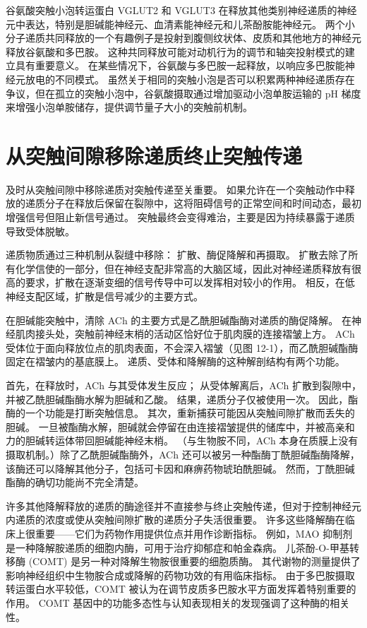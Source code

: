 谷氨酸突触小泡转运蛋白 VGLUT2 和 VGLUT3 在释放其他类别神经递质的神经元中表达，特别是胆碱能神经元、血清素能神经元和儿茶酚胺能神经元。
两个小分子递质共同释放的一个有趣例子是投射到腹侧纹状体、皮质和其他地方的神经元释放谷氨酸和多巴胺。 这种共同释放可能对动机行为的调节和轴突投射模式的建立具有重要意义。
在某些情况下，谷氨酸与多巴胺一起释放，以响应多巴胺能神经元放电的不同模式。
虽然关于相同的突触小泡是否可以积累两种神经递质存在争议，但在孤立的突触小泡中，谷氨酸摄取通过增加驱动小泡单胺运输的 pH 梯度来增强小泡单胺储存，提供调节量子大小的突触前机制。



\section{从突触间隙移除递质终止突触传递}

及时从突触间隙中移除递质对突触传递至关重要。
如果允许在一个突触动作中释放的递质分子在释放后保留在裂隙中，这将阻碍信号的正常空间和时间动态，最初增强信号但阻止新信号通过。
突触最终会变得难治，主要是因为持续暴露于递质导致受体脱敏。


递质物质通过三种机制从裂缝中移除：
扩散、酶促降解和再摄取。
扩散去除了所有化学信使的一部分，但在神经支配非常高的大脑区域，因此对神经递质释放有很高的要求，扩散在逐渐变细的信号传导中可以发挥相对较小的作用。
相反，在低神经支配区域，扩散是信号减少的主要方式。


在胆碱能突触中，清除 ACh 的主要方式是乙酰胆碱酯酶对递质的酶促降解。
在神经肌肉接头处，突触前神经末梢的活动区恰好位于肌肉膜的连接褶皱上方。
ACh 受体位于面向释放位点的肌肉表面，不会深入褶皱（见图 12-1），而乙酰胆碱酯酶固定在褶皱内的基底膜上。
递质、受体和降解酶的这种解剖结构有两个功能。


首先，在释放时，ACh 与其受体发生反应；
从受体解离后，ACh 扩散到裂隙中，并被乙酰胆碱酯酶水解为胆碱和乙酸。
结果，递质分子仅被使用一次。
因此，酯酶的一个功能是打断突触信息。
其次，重新捕获可能因从突触间隙扩散而丢失的胆碱。
一旦被酯酶水解，胆碱就会停留在由连接褶皱提供的储库中，并被高亲和力的胆碱转运体带回胆碱能神经末梢。
（与生物胺不同，ACh 本身在质膜上没有摄取机制。）除了乙酰胆碱酯酶外，ACh 还可以被另一种酯酶丁酰胆碱酯酶降解，该酶还可以降解其他分子，包括可卡因和麻痹药物琥珀酰胆碱。
然而，丁酰胆碱酯酶的确切功能尚不完全清楚。


许多其他降解释放的递质的酶途径并不直接参与终止突触传递，但对于控制神经元内递质的浓度或使从突触间隙扩散的递质分子失活很重要。
许多这些降解酶在临床上很重要——它们为药物作用提供位点并用作诊断指标。
例如，MAO 抑制剂是一种降解胺递质的细胞内酶，可用于治疗抑郁症和帕金森病。
儿茶酚-O-甲基转移酶 (COMT) 是另一种对降解生物胺很重要的细胞质酶。
其代谢物的测量提供了影响神经组织中生物胺合成或降解的药物功效的有用临床指标。
由于多巴胺摄取转运蛋白水平较低，COMT 被认为在调节皮质多巴胺水平方面发挥着特别重要的作用。
COMT 基因中的功能多态性与认知表现相关的发现强调了这种酶的相关性。


